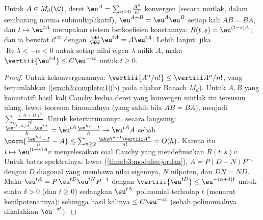 \begin{theorem}\label{thm:b3:ode:matrixexp}
Untuk $A \in M_d(\C)$, deret $\eu^{A} =
\sum_{n\geq0}\frac{A^n}{n!}$ konvergen (secara mutlak, dalam sembarang
norma submultiplikatif), $\eu^{A+B} = \eu^A\eu^B$ setiap kali
$AB = BA$, dan $t \mapsto \eu^{tA}$ merupakan 
sistem berkoefisien konstannya: $R(t,s) = \eu^{(t-s)A}$; dan ia bersifat $\mathcal
C^\infty$ dengan $\frac{\dd}{\dd t}\eu^{tA} = A\eu^{tA}$.
Lebih lanjut: jika $\operatorname{Re}\lambda < -\alpha < 0$ untuk
setiap nilai eigen $\lambda$ milik $A$, maka $\vertiii{\eu^{tA}}
\leq C\eu^{-\alpha t}$ untuk $t \geq 0$.
\end{theorem}

\begin{proof}
Untuk kekonvergenannya: $\vertiii{A^n/n!} \leq \vertiii A^n/n!$, yang terjumlahkan
(\cref{exo:b3:complete:1}(b) pada aljabar Banach
$M_d$). Untuk $A, B$ yang komutatif: hasil kali Cauchy kedua
deret yang konvergen mutlak itu tersusun ulang, lewat teorema
binomialnya (yang sahih bila $AB = BA$), menjadi
$\sum_n\frac{(A+B)^n}{n!}$. Untuk keterturunannya, secara langsung:
$\frac{\eu^{(t+h)A} - \eu^{tA}}h = \eu^{tA}\frac{\eu^{hA} -
I}{h} \to \eu^{tA}A$ sebab $\norm{\frac{\eu^{hA} - I}h - A}
\leq \sum_{n\geq2}\frac{\abs h^{n-1}\vertiii A^n}{n!} =
O(h)$. Karena itu $t \mapsto \eu^{(t - s)A}v$ menyelesaikan soal
Cauchy yang mendefinisikan $R(t,s)v$. Untuk batas spektralnya: lewat 
(\cref{thm:b3:modules:jordan}), $A = P(D + N)P^{-1}$ dengan $D$
diagonal yang membawa nilai eigennya, $N$ nilpoten, dan $DN =
ND$. Maka $\eu^{tA} = P\,\eu^{tD}\eu^{tN}P^{-1}$ dengan
$\vertiii{\eu^{tD}} \leq \eu^{-(\alpha + \delta)t}$ untuk suatu
$\delta > 0$ (dan $t \geq 0$) sedangkan $\eu^{tN}$ polinomial terhadap $t$
(menurut kenilpotenannya): sehingga hasil kalinya $\leq C\eu^{-\alpha t}$
(sebab polinomialnya dikalahkan $\eu^{-\delta t}$).
\end{proof}

